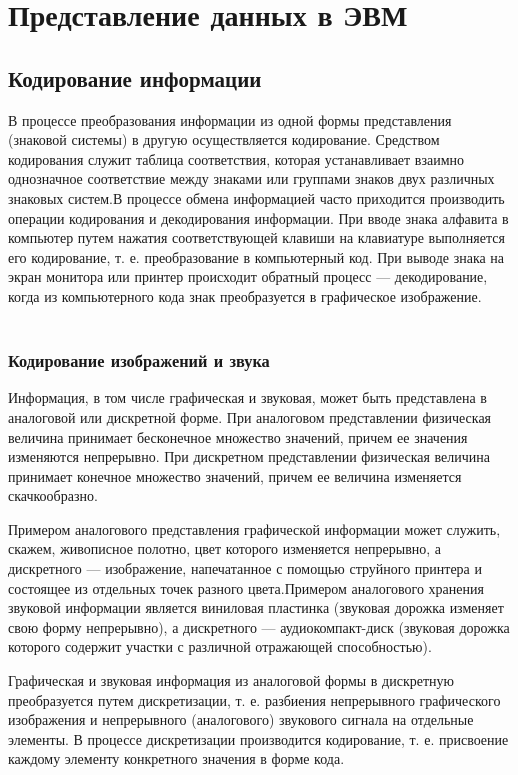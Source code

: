 \documentclass[a4paper]{article}
\begin{document}
\section{Представление данных в ЭВМ}

\subsection{Кодирование информации}
 В процессе преобразования информации из одной формы представления (знаковой системы) в другую осуществляется кодирование. Средством кодирования служит таблица соответствия, которая устанавливает взаимно однозначное соответствие между знаками или группами знаков двух различных знаковых систем.В процессе обмена информацией часто приходится производить операции кодирования и декодирования информации. При вводе знака алфавита в компьютер путем нажатия соответствующей клавиши на клавиатуре выполняется его кодирование, т. е. преобразование в компьютерный код. При выводе знака на экран монитора или принтер происходит обратный процесс — декодирование, когда из компьютерного кода знак преобразуется в графическое изображение.
     
 \subsubsection{Кодирование изображений и звука}
 Информация, в том числе графическая и звуковая, может быть представлена в аналоговой или дискретной форме. При аналоговом представлении физическая величина принимает бесконечное множество значений, причем ее значения изменяются непрерывно. При дискретном представлении физическая величина принимает конечное множество значений, причем ее величина изменяется скачкообразно.

 Примером аналогового представления графической информации может служить, скажем, живописное полотно, цвет которого изменяется непрерывно, а дискретного — изображение, напечатанное с помощью струйного принтера и состоящее из отдельных точек разного цвета.Примером аналогового хранения звуковой информации является виниловая пластинка (звуковая дорожка изменяет свою форму непрерывно), а дискретного — аудиокомпакт-диск (звуковая дорожка которого содержит участки с различной отражающей способностью).

 Графическая и звуковая информация из аналоговой формы в дискретную преобразуется путем дискретизации, т. е. разбиения непрерывного графического изображения и непрерывного (аналогового) звукового сигнала на отдельные элементы. В процессе дискретизации производится кодирование, т. е. присвоение каждому элементу конкретного значения в форме кода.
\end{document}
